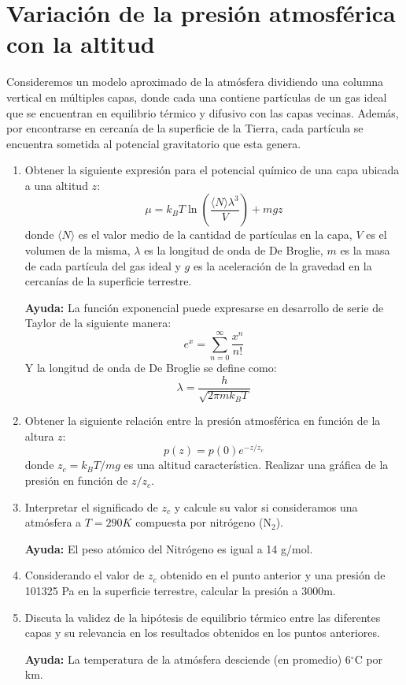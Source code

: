 \documentclass[a4paper,11pt]{article}
\begin{document}
\section{Variación de la presión atmosférica con la altitud}

Consideremos un modelo aproximado de la atmósfera dividiendo una 
columna vertical en múltiples capas, donde cada una contiene partículas 
de un gas ideal que se encuentran en equilibrio térmico y difusivo con 
las capas vecinas. Además, por encontrarse en cercanía de la superficie 
de la Tierra, cada partícula se encuentra sometida al potencial 
gravitatorio que esta genera.


\begin{enumerate}[label=(\alph*),
                  leftmargin=2\parindent,
                  rightmargin=2\parindent]

    \item{Obtener la siguiente expresión para el potencial químico de 
          una capa ubicada a una altitud $z$:
          $$ \mu =
          k_B T \ln \left( \frac{\langle N \rangle \lambda^3}{V} \right)
          + mgz $$
          donde $\langle N \rangle$ es el valor medio de la cantidad de 
          partículas en la capa, $V$ es el volumen de la misma, 
          $\lambda$ es la longitud de onda de De Broglie, $m$ es la 
          masa de cada partícula del gas ideal y $g$ es la aceleración 
          de la gravedad en la cercanías de la superficie terrestre.
          }

    {\small
    \textbf{Ayuda:}
    La función exponencial puede expresarse en desarrollo de serie de 
    Taylor de la siguiente manera:
    $$ e^x = \sum_{n=0}^\infty \frac{x^n}{n!} $$
    Y la longitud de onda de De Broglie se define como:
    $$ \lambda = \frac{h}{\sqrt{2\pi m k_B T}} $$
    }

    \item{Obtener la siguiente relación entre la presión atmosférica 
          en función de la altura $z$:
          $$ p(z) = p(0) e^{-z/z_c} $$
          donde $z_c = k_B T / mg$ es una altitud característica.
          Realizar una gráfica de la presión en función de $z/z_c$.
          }
    
    \item{Interpretar el significado de $z_c$ y calcule su valor si 
          consideramos una atmósfera a $T = 290 K$ compuesta por 
          nitrógeno (N$_2$).}

    {\small
    \textbf{Ayuda:}
    El peso atómico del Nitrógeno es igual a 14 g/mol.
    }

    \item{Considerando el valor de $z_c$ obtenido en el punto anterior 
          y una presión de 101325 Pa en la superficie terrestre,
          calcular la presión a 3000m.}

    \item{Discuta la validez de la hipótesis de equilibrio térmico 
          entre las diferentes capas y su relevancia en los resultados 
          obtenidos en los puntos anteriores.}
    
    {\small
    \textbf{Ayuda:}
    La temperatura de la atmósfera desciende (en promedio) 6$^\circ$C 
    por km.
    }

\end{enumerate}
\end{document}
